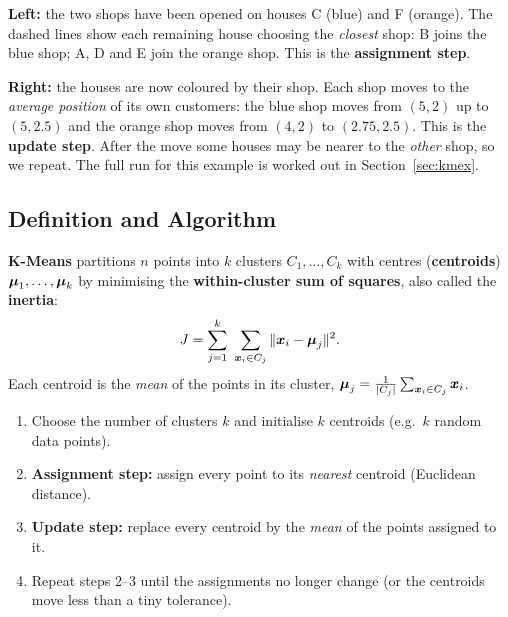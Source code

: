 \begin{explain}
\textbf{Left:} the two shops have been opened on houses C (blue) and F (orange). The dashed lines show each remaining house choosing the \emph{closest} shop: B joins the blue shop; A, D and E join the orange shop. This is the \textbf{assignment step}.

\medskip
\textbf{Right:} the houses are now coloured by their shop. Each shop moves to the \emph{average position} of its own customers: the blue shop moves from $(5,2)$ up to $(5,2.5)$ and the orange shop moves from $(4,2)$ to $(2.75,2.5)$. This is the \textbf{update step}. After the move some houses may be nearer to the \emph{other} shop, so we repeat. The full run for this example is worked out in Section~\ref{sec:kmex}.
\end{explain}

\subsection{Definition and Algorithm}

\begin{definition}
\textbf{K-Means} partitions $n$ points into $k$ clusters $C_1,\dots,C_k$ with centres (\textbf{centroids}) $\boldsymbol{\mu}_1,\dots,\boldsymbol{\mu}_k$ by minimising the \textbf{within-cluster sum of squares}, also called the \textbf{inertia}:
\[
  J=\sum_{j=1}^{k}\ \sum_{\vect x_i\in C_j}\|\vect x_i-\vect\mu_j\|^{2}.
\]
Each centroid is the \emph{mean} of the points in its cluster, $\boldsymbol{\mu}_j=\frac1{|C_j|}\sum_{\boldsymbol{x}_i\in C_j}\boldsymbol{x}_i$.
\end{definition}

\begin{definition}
\begin{enumerate}
  \item Choose the number of clusters $k$ and initialise $k$ centroids (e.g.\ $k$ random data points).
  \item \textbf{Assignment step:} assign every point to its \emph{nearest} centroid (Euclidean distance).
  \item \textbf{Update step:} replace every centroid by the \emph{mean} of the points assigned to it.
  \item Repeat steps 2--3 until the assignments no longer change (or the centroids move less than a tiny tolerance).
\end{enumerate}
\end{definition}

